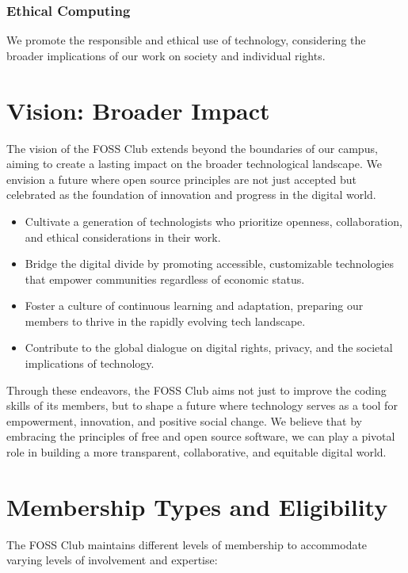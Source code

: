 \documentclass[12pt,a4paper]{article}
\begin{document}
\subsubsection{Ethical Computing}
We promote the responsible and ethical use of technology, considering the broader implications of our work on society and individual rights.

\section{Vision: Broader Impact}

The vision of the FOSS Club extends beyond the boundaries of our campus, aiming to create a lasting impact on the broader technological landscape. We envision a future where open source principles are not just accepted but celebrated as the foundation of innovation and progress in the digital world.

\begin{itemize}
    \item Cultivate a generation of technologists who prioritize openness, collaboration, and ethical considerations in their work.
    \item Bridge the digital divide by promoting accessible, customizable technologies that empower communities regardless of economic status.
    \item Foster a culture of continuous learning and adaptation, preparing our members to thrive in the rapidly evolving tech landscape.
    \item Contribute to the global dialogue on digital rights, privacy, and the societal implications of technology.
\end{itemize}

Through these endeavors, the FOSS Club aims not just to improve the coding skills of its members, but to shape a future where technology serves as a tool for empowerment, innovation, and positive social change. We believe that by embracing the principles of free and open source software, we can play a pivotal role in building a more transparent, collaborative, and equitable digital world.

\section{Membership Types and Eligibility}

The FOSS Club maintains different levels of membership to accommodate varying levels of involvement and expertise:
\end{document}
